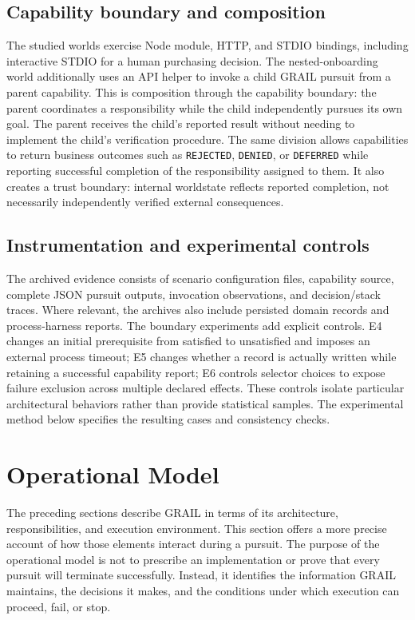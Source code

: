 \documentclass[11pt]{article}
\begin{document}
\subsection{Capability boundary and composition}
The studied worlds exercise Node module, HTTP, and STDIO bindings, including interactive STDIO for a human purchasing decision. The nested-onboarding world additionally uses an API helper to invoke a child GRAIL pursuit from a parent capability. This is composition through the capability boundary: the parent coordinates a responsibility while the child independently pursues its own goal. The parent receives the child's reported result without needing to implement the child's verification procedure. The same division allows capabilities to return business outcomes such as \texttt{REJECTED}, \texttt{DENIED}, or \texttt{DEFERRED} while reporting successful completion of the responsibility assigned to them. It also creates a trust boundary: internal worldstate reflects reported completion, not necessarily independently verified external consequences.

\subsection{Instrumentation and experimental controls}
The archived evidence consists of scenario configuration files, capability source, complete JSON pursuit outputs, invocation observations, and decision/stack traces. Where relevant, the archives also include persisted domain records and process-harness reports. The boundary experiments add explicit controls. E4 changes an initial prerequisite from satisfied to unsatisfied and imposes an external process timeout; E5 changes whether a record is actually written while retaining a successful capability report; E6 controls selector choices to expose failure exclusion across multiple declared effects. These controls isolate particular architectural behaviors rather than provide statistical samples. The experimental method below specifies the resulting cases and consistency checks.

\section{Operational Model}\label{sec:operational-model}
The preceding sections describe GRAIL in terms of its architecture, responsibilities, and execution environment. This section offers a more precise account of how those elements interact during a pursuit. The purpose of the operational model is not to prescribe an implementation or prove that every pursuit will terminate successfully. Instead, it identifies the information GRAIL maintains, the decisions it makes, and the conditions under which execution can proceed, fail, or stop.
\end{document}
